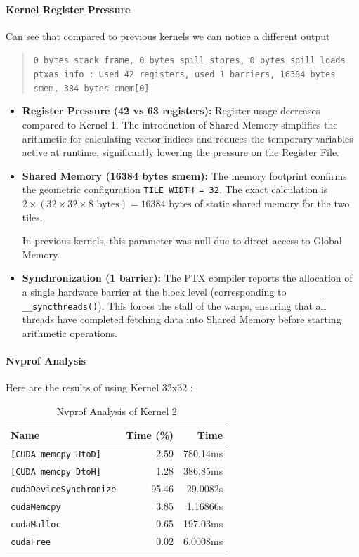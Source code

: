     
\paragraph{Kernel Register Pressure}Can see that compared to previous kernels we can notice a different output

\begin{quote}
\texttt{0 bytes stack frame, 0 bytes spill stores, 0 bytes spill loads \\
ptxas info    : Used 42 registers, used 1 barriers, 16384 bytes smem, 384 bytes cmem[0]}
\end{quote}
\begin{itemize}
    \item \textbf{Register Pressure (42 vs 63 registers):} Register usage decreases compared to Kernel 1. The introduction of Shared Memory simplifies the arithmetic for calculating vector indices and reduces the temporary variables active at runtime, significantly lowering the pressure on the Register File.
    \item \textbf{Shared Memory (16384 bytes smem):} The memory footprint confirms the geometric configuration \texttt{TILE\_WIDTH = 32}. The exact calculation is $2 \times (32 \times 32 \times 8 \text{ bytes}) = 16384 \text{ bytes}$ of static shared memory for the two tiles. 
    
    In previous kernels, this parameter was null due to direct access to Global Memory.

    
    \item \textbf{Synchronization (1 barrier):} The PTX compiler reports the allocation of a single hardware barrier at the block level (corresponding to \texttt{\_\_syncthreads()}). This forces the stall of the warps, ensuring that all threads have completed fetching data into Shared Memory before starting arithmetic operations.
\end{itemize}
\vspace{20px}

\paragraph{Nvprof Analysis} Here are the results of using Kernel 32x32 :
\begin{table}[h]
\centering
\begin{tabular}{lrr}
\toprule
Name & Time (\%) & Time \\
\midrule
\texttt{[CUDA memcpy HtoD]} & 2.59 & 780.14ms \\
\texttt{[CUDA memcpy DtoH]} & 1.28 & 386.85ms \\
\texttt{cudaDeviceSynchronize} & 95.46 & 29.0082s \\
\texttt{cudaMemcpy} & 3.85 & 1.16866s \\
\texttt{cudaMalloc} & 0.65 & 197.03ms \\
\texttt{cudaFree} & 0.02 & 6.0008ms \\
\bottomrule
\end{tabular}
\caption{Nvprof Analysis of Kernel 2}
\label{tab:nvprof_analysis_updated}
\end{table}

